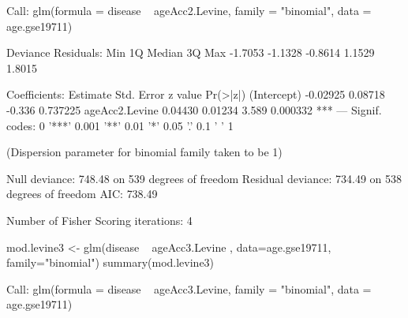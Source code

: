 \documentclass[]{article}
\newcommand{\hlnum}[1]{\textcolor[rgb]{0.816,0.125,0.439}{#1}}%
\newcommand{\hlstr}[1]{\textcolor[rgb]{0.251,0.627,0.251}{#1}}%
\newcommand{\hlopt}[1]{\textcolor[rgb]{0,0,0}{#1}}%
\newcommand{\hlstd}[1]{\textcolor[rgb]{0.251,0.251,0.251}{#1}}%
\newcommand{\hlkwc}[1]{\textcolor[rgb]{0.251,0.251,0.251}{#1}}%
\newcommand{\hlkwd}[1]{\textcolor[rgb]{0.878,0.439,0.125}{#1}}%
\newenvironment{Shaded}{\begin{myshaded}}{\end{myshaded}}
\newcommand{\KeywordTok}[1]{\hlkwd{#1}}
\newcommand{\DataTypeTok}[1]{\hlkwc{#1}}
\newcommand{\DecValTok}[1]{\hlnum{#1}}
\newcommand{\FloatTok}[1]{\hlnum{#1}}
\newcommand{\StringTok}[1]{\hlstr{#1}}
\newcommand{\ControlFlowTok}[1]{\hlkwd{#1}}
\newcommand{\OperatorTok}[1]{\hlopt{#1}}
\newcommand{\ErrorTok}[1]{\textcolor{errorcolor}{#1}}
\newcommand{\NormalTok}[1]{\hlstd{#1}}
\begin{document}
\begin{Shaded}
\begin{Highlighting}[]
\NormalTok{  Call}\OperatorTok{:}
\StringTok{  }\KeywordTok{glm}\NormalTok{(}\DataTypeTok{formula =}\NormalTok{ disease }\OperatorTok{~}\StringTok{ }\NormalTok{ageAcc2.Levine, }\DataTypeTok{family =} \StringTok{"binomial"}\NormalTok{, }
      \DataTypeTok{data =}\NormalTok{ age.gse19711)}
  
\NormalTok{  Deviance Residuals}\OperatorTok{:}\StringTok{ }
\StringTok{      }\NormalTok{Min       1Q   Median       3Q      Max  }
  \FloatTok{-1.7053}  \FloatTok{-1.1328}  \FloatTok{-0.8614}   \FloatTok{1.1529}   \FloatTok{1.8015}  
  
\NormalTok{  Coefficients}\OperatorTok{:}
\StringTok{                 }\NormalTok{Estimate Std. Error z value }\KeywordTok{Pr}\NormalTok{(}\OperatorTok{>}\ErrorTok{|}\NormalTok{z}\OperatorTok{|}\NormalTok{)    }
\NormalTok{  (Intercept)    }\FloatTok{-0.02925}    \FloatTok{0.08718}  \FloatTok{-0.336} \FloatTok{0.737225}    
\NormalTok{  ageAcc2.Levine  }\FloatTok{0.04430}    \FloatTok{0.01234}   \FloatTok{3.589} \FloatTok{0.000332} \OperatorTok{**}\ErrorTok{*}
\StringTok{  }\OperatorTok{---}
\StringTok{  }\NormalTok{Signif. codes}\OperatorTok{:}\StringTok{  }\DecValTok{0} \StringTok{'***'} \FloatTok{0.001} \StringTok{'**'} \FloatTok{0.01} \StringTok{'*'} \FloatTok{0.05} \StringTok{'.'} \FloatTok{0.1} \StringTok{' '} \DecValTok{1}
  
\NormalTok{  (Dispersion parameter }\ControlFlowTok{for}\NormalTok{ binomial family taken to be }\DecValTok{1}\NormalTok{)}
  
\NormalTok{      Null deviance}\OperatorTok{:}\StringTok{ }\FloatTok{748.48}\NormalTok{  on }\DecValTok{539}\NormalTok{  degrees of freedom}
\NormalTok{  Residual deviance}\OperatorTok{:}\StringTok{ }\FloatTok{734.49}\NormalTok{  on }\DecValTok{538}\NormalTok{  degrees of freedom}
\NormalTok{  AIC}\OperatorTok{:}\StringTok{ }\FloatTok{738.49}
  
\NormalTok{  Number of Fisher Scoring iterations}\OperatorTok{:}\StringTok{ }\DecValTok{4}

\NormalTok{mod.levine3 <-}\StringTok{ }\KeywordTok{glm}\NormalTok{(disease }\OperatorTok{~}\StringTok{ }\NormalTok{ageAcc3.Levine , }\DataTypeTok{data=}\NormalTok{age.gse19711,}
           \DataTypeTok{family=}\StringTok{"binomial"}\NormalTok{)}
\KeywordTok{summary}\NormalTok{(mod.levine3)}
  
\NormalTok{  Call}\OperatorTok{:}
\StringTok{  }\KeywordTok{glm}\NormalTok{(}\DataTypeTok{formula =}\NormalTok{ disease }\OperatorTok{~}\StringTok{ }\NormalTok{ageAcc3.Levine, }\DataTypeTok{family =} \StringTok{"binomial"}\NormalTok{, }
      \DataTypeTok{data =}\NormalTok{ age.gse19711)}
  

\end{Highlighting}
\end{Shaded}
\end{document}
